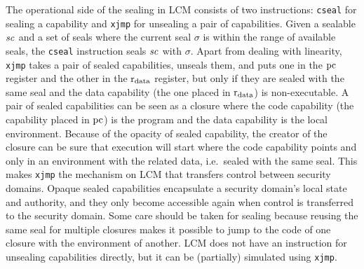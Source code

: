 \documentclass[acmsmall,review,showframe]{acmart}\settopmatter{printfolios=true,printccs=false,printacmref=false}
\newcommand{\trgcm}{\textsc{LCM}}
\begin{document}
The operational side of the sealing in \trgcm{} consists of two instructions: \texttt{cseal} for sealing a capability and \texttt{xjmp} for unsealing a pair of capabilities.
Given a sealable $\mathit{sc}$ and a set of seals where the current seal $\sigma$ is within the range of available seals, the \texttt{cseal} instruction seals $\mathit{sc}$ with $\sigma$.
Apart from dealing with linearity, \texttt{xjmp} takes a pair of sealed capabilities, unseals them, and puts one in the $\mathrm{pc}$ register and the other in the $\mathrm{r}_\mathrm{data}$ register, but only if they are sealed with the same seal and the data capability (the one placed in $\mathrm{r}_\mathrm{data}$) is non-executable.
A pair of sealed capabilities can be seen as a closure where the code capability (the capability placed in $\mathrm{pc}$) is the program and the data capability is the local environment.
Because of the opacity of sealed capability, the creator of the closure can be sure that execution will start where the code capability points and only in an environment with the related data, i.e.\ sealed with the same seal.
This makes \texttt{xjmp} the mechanism on \trgcm{} that transfers control between security domains.
Opaque sealed capabilities encapsulate a security domain's local state and authority, and they only become accessible again when control is transferred to the security domain.
Some care should be taken for sealing because reusing the same seal for multiple closures makes it possible to jump to the code of one closure with the environment of another.
\trgcm{} does not have an instruction for unsealing capabilities directly, but it can be (partially) simulated using \texttt{xjmp}.
\end{document}
